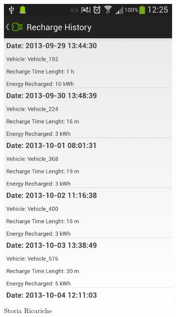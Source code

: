 \begin{figure}
\begin{subfigure}{0.45\textwidth}
		\includegraphics[width=\textwidth]{assets/mobile-app-recharge-history.png}
		\caption{Storia Ricariche}
		\label{fig:recharge-history}
	\end{subfigure}
	\begin{subfigure}{0.45\textwidth}

\end{subfigure}
\end{figure}
